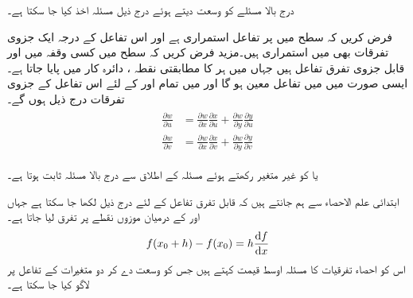 درج بالا مسئلے کو وسعت دیتے ہوئے درج ذیل مسئلہ اخذ کیا جا سکتا ہے۔

فرض کریں کہ  سطح میں   پر تفاعل  استمراری ہے  اور  اس تفاعل کے درجہ ایک جزوی تفرقات بھی  میں استمراری ہیں۔مزید فرض کریں کہ  سطح میں کسی وقفہ  میں  اور  قابل جزوی تفرق تفاعل ہیں جہاں  میں ہر  کا مطابقتی نقطہ ، دائرہ کار  میں پایا جاتا ہے۔ایسی صورت میں  میں تفاعل   معین ہو گا اور  میں تمام  اور  کے لئے اس تفاعل کے جزوی تفرقات  درج ذیل ہوں گے۔
\begin{gather}
\begin{aligned}\label{مساوات_الاحصاء_زنجیری_ترکیب_کلیات}
\frac{\partial w}{\partial u}&=\frac{\partial w}{\partial x}\frac{\partial x}{\partial u}+\frac{\partial w}{\partial y}\frac{\partial y}{\partial u}\\
\frac{\partial w}{\partial v}&=\frac{\partial w}{\partial x}\frac{\partial x}{\partial v}+\frac{\partial w}{\partial y}\frac{\partial y}{\partial v}
\end{aligned}
\end{gather}

 یا  کو غیر متغیر رکھتے ہوئے مسئلہ  کے اطلاق سے  درج بالا مسئلہ ثابت ہوتا ہے۔

ابتدائی علم الاحصاء  سے ہم جانتے ہیں کہ قابل تفرق تفاعل  کے لئے درج ذیل لکھا جا سکتا ہے جہاں  اور  کے درمیان موزوں نقطے پر تفرق لیا جاتا ہے۔
\begin{align*}
f(x_0+h)-f(x_0)=h\frac{\dif f}{\dif x}
\end{align*}
اس کو احصاء تفرقیات کا مسئلہ اوسط قیمت کہتے ہیں جس کو  وسعت دے کر  دو متغیرات کے تفاعل پر لاگو  کیا جا سکتا ہے۔

